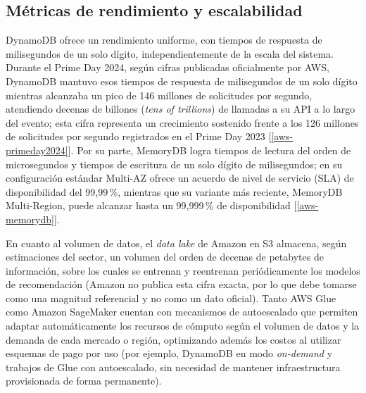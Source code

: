 \documentclass[12pt,a4paper]{article}
\begin{document}
\subsection{Métricas de rendimiento y escalabilidad}
DynamoDB ofrece un rendimiento uniforme, con tiempos de respuesta de
milisegundos de un solo dígito, independientemente de la escala del sistema.
Durante el Prime Day 2024, según cifras publicadas oficialmente por AWS,
DynamoDB mantuvo esos tiempos de respuesta de milisegundos de un solo dígito
mientras alcanzaba un pico de 146 millones de solicitudes por segundo,
atendiendo decenas de billones (\textit{tens of trillions}) de llamadas a su
API a lo largo del evento; esta cifra representa un crecimiento sostenido
frente a los 126 millones de solicitudes por segundo registrados en el Prime
Day 2023 [\ref{aws-primeday2024}]. Por su parte, MemoryDB logra tiempos de
lectura del orden de microsegundos y tiempos de escritura de un solo dígito de
milisegundos; en su configuración estándar Multi-AZ ofrece un acuerdo de
nivel de servicio (SLA) de disponibilidad del 99{,}99\,\%, mientras que su
variante más reciente, MemoryDB Multi-Region, puede alcanzar hasta un
99{,}999\,\% de disponibilidad [\ref{aws-memorydb}].

En cuanto al volumen de datos, el \textit{data lake} de Amazon en S3 almacena,
según estimaciones del sector, un volumen del orden de decenas de petabytes de
información, sobre los cuales se entrenan y reentrenan periódicamente los
modelos de recomendación (Amazon no publica esta cifra exacta, por lo que debe
tomarse como una magnitud referencial y no como un dato oficial). Tanto AWS
Glue como Amazon SageMaker cuentan con mecanismos de autoescalado que permiten
adaptar automáticamente los recursos de cómputo según el volumen de datos y la
demanda de cada mercado o región, optimizando además los costos al utilizar
esquemas de pago por uso (por ejemplo, DynamoDB en modo \textit{on-demand} y
trabajos de Glue con autoescalado, sin necesidad de mantener infraestructura
provisionada de forma permanente).
\end{document}
